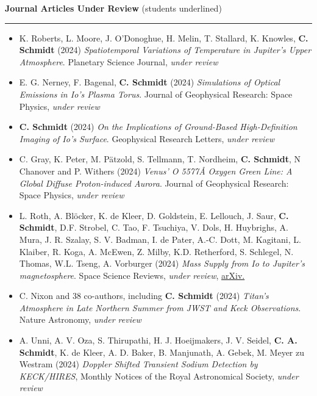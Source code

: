 \documentclass[12pt]{report}
\begin{document}
\vspace{2 mm}
\noindent\textbf{Journal Articles Under Review} (students underlined) \rm\hspace*{\fill} \\
\rule{\textwidth}{1pt}
\begin{itemize} \itemsep -2pt %
  \item K. Roberts, L. Moore, J. O'Donoghue, H. Melin, T. Stallard, K. Knowles, \textbf{C. Schmidt} (2024) \textit{Spatiotemporal Variations of Temperature in Jupiter's Upper Atmosphere}. Planetary Science Journal, \textit{under review}
  \item E. G. Nerney, F. Bagenal, \textbf{C. Schmidt} (2024) \textit{Simulations of Optical Emissions in Io's Plasma Torus}. Journal of Geophysical Research: Space Physics, \textit{under review}
  \item \textbf{C. Schmidt} (2024) \textit{On the Implications of Ground-Based High-Definition Imaging of Io's Surface}. Geophysical Research Letters, \textit{under review}
  \item C. Gray, K. Peter, M. P\"atzold, S. Tellmann, T. Nordheim, \textbf{C. Schmidt}, N Chanover and P. Withers (2024) \textit{Venus' O 5577{\AA} Oxygen Green Line: A Global Diffuse Proton-induced Aurora}. Journal of Geophysical Research: Space Physics, \textit{under review}
  \item L. Roth, A. Bl\"ocker, K. de Kleer, D. Goldstein, E. Lellouch, J. Saur, \textbf{C. Schmidt}, D.F. Strobel, C. Tao, F. Tsuchiya, V. Dols, H. Huybrighs, A. Mura, J. R. Szalay, S. V. Badman, I. de Pater, A.-C. Dott, M. Kagitani, L. Klaiber, R. Koga, A. McEwen, Z. Milby, K.D. Retherford, S. Schlegel, N. Thomas, W.L. Tseng, A. Vorburger (2024) \textit{Mass Supply from Io to Jupiter's magnetosphere}. Space Science Reviews, \textit{under review}, \href{https://doi.org/10.48550/arXiv.2403.13970}{arXiv.}
  \item C. Nixon and 38 co-authors, including \textbf{C. Schmidt} (2024) \textit{Titan's Atmosphere in Late Northern Summer from JWST and Keck Observations}. Nature Astronomy, \textit{under review}
  \item A. Unni, A. V. Oza, S. Thirupathi, H. J. Hoeijmakers, J. V. Seidel, \textbf{C. A. Schmidt}, K. de Kleer, A. D. Baker, B. Manjunath, A. Gebek, M. Meyer zu Westram (2024) \textit{Doppler Shifted Transient Sodium Detection by KECK/HIRES}, Monthly Notices of the Royal Astronomical Society, \textit{under review}
 \end{itemize}
\end{document}
